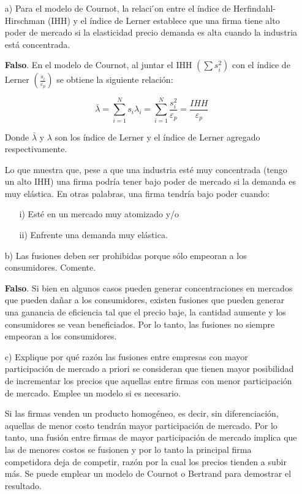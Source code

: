 \documentclass{exam}
\begin{document}
\begin{itemize}
    \item[a)] Para el modelo de Cournot, la relaci ́on entre el índice de Herfindahl-Hirschman (IHH) y el índice de Lerner establece que una firma tiene alto poder de mercado si la elasticidad precio demanda es alta cuando la industria está concentrada. 
    \begin{solution}
        \textbf{Falso}. En el modelo de Cournot, al juntar el IHH \(\left( \sum s_i^2 \right)\) con el índice de Lerner \(\left( \frac{s_i}{\varepsilon_p} \right)\) se obtiene la siguiente relación:

\[
\bar{\lambda} = \sum_{i=1}^{N} s_i \lambda_i = \sum_{i=1}^{N} \frac{s_i^2}{\varepsilon_p} = \frac{IHH}{\varepsilon_p}
\]

Donde \(\bar{\lambda}\) y \(\lambda\) son los índice de Lerner y el índice de Lerner agregado respectivamente.

Lo que muestra que, pese a que una industria esté muy concentrada (tengo un alto IHH) una firma podría tener bajo poder de mercado si la demanda es muy elástica. En otras palabras, una firma tendría bajo poder cuando: 
\begin{itemize}
    \item[i)] Esté en un mercado muy atomizado y/o 
    \item[ii)] Enfrente una demanda muy elástica.
\end{itemize}
\end{solution}

\item [b)] Las fusiones deben ser prohibidas porque sólo empeoran a los consumidores. Comente.
\begin{solution}
    \textbf{Falso}. Si bien en algunos casos pueden generar concentraciones en mercados que pueden dañar a los consumidores, existen fusiones que pueden generar una ganancia de eficiencia tal que el precio baje, la cantidad aumente y los consumidores se vean beneficiados. Por lo tanto, las fusiones no siempre empeoran a los consumidores.
\end{solution}
\item[c)] Explique por qué razón las fusiones entre empresas con mayor participación de mercado a priori se consideran que tienen mayor posibilidad de incrementar los precios que aquellas entre firmas con menor participación de mercado. Emplee un modelo si es necesario.
\begin{solution}
    Si las firmas venden un producto homogéneo, es decir, sin diferenciación, aquellas de menor costo tendrán mayor participación de mercado. Por lo tanto, una fusión entre firmas de mayor participación de mercado implica que las de menores costos se fusionen y por lo tanto la principal firma competidora deja de competir, razón por la cual los precios tienden a subir más. Se puede emplear un modelo de Cournot o Bertrand para demostrar el resultado.
\end{solution}


\end{itemize}
\end{document}
